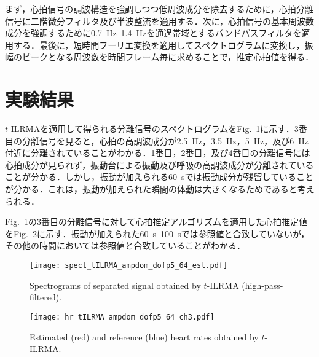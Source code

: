 \documentclass[a4j]{jsarticle}
\begin{document}
まず，心拍信号の調波構造を強調しつつ低周波成分を除去するために，心拍分離信号に二階微分フィルタ及び半波整流を適用する．次に，心拍信号の基本周波数成分を強調するために0.7~Hz--1.4~Hzを通過帯域とするバンドパスフィルタを適用する．最後に，短時間フーリエ変換を適用してスペクトログラムに変換し，振幅のピークとなる周波数を時間フレーム毎に求めることで，推定心拍値を得る．

\section{実験結果}
$t$-ILRMAを適用して得られる分離信号のスペクトログラムをFig.~\ref{fig:stilrmaa5}に示す．3番目の分離信号を見ると，心拍の高調波成分が2.5~Hz，3.5~Hz，5~Hz，及び6~Hz付近に分離されていることがわかる．1番目，2番目，及び4番目の分離信号には心拍成分が見られず，振動台による振動及び呼吸の高調波成分が分離されていることが分かる．しかし，振動が加えられる60~sでは振動成分が残留していることが分かる．これは，振動が加えられた瞬間の体動は大きくなるためであると考えられる．

Fig.~\ref{fig:stilrmaa5}の3番目の分離信号に対して心拍推定アルゴリズムを適用した心拍推定値をFig.~\ref{fig:hrtilrmaa5}に示す．振動が加えられた60~s--100~sでは参照値と合致していないが，その他の時間においては参照値と合致していることがわかる．

\begin{figure}[t]
  \centering
  \vspace{0pt} %
  \texttt{[image: spect\_tILRMA\_ampdom\_dofp5\_64\_est.pdf]}
  \vspace{-20pt} %
  \caption{Spectrograms of separated signal obtained by $t$-ILRMA (high-pass-filtered).}
  \vspace{0pt} %
  \label{fig:stilrmaa5}
\end{figure}

\begin{figure}[t]
  \centering
  \vspace{-10pt} %
  \texttt{[image: hr\_tILRMA\_ampdom\_dofp5\_64\_ch3.pdf]}
  \vspace{-10pt} %
  \caption{Estimated (red) and reference (blue) heart rates obtained by $t$-ILRMA.}
  \vspace{-20pt} %
  \label{fig:hrtilrmaa5}
\end{figure}
\end{document}
